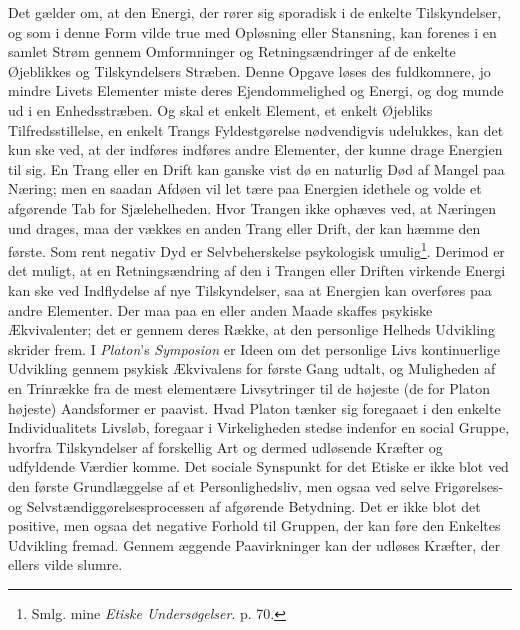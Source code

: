 \documentclass[12pt,a4paper]{book}
\newcommand{\opage}[1]{\marginnote{\footnotesize\textit{[#1]}}}
\begin{document}
Det gælder om, at den Energi, der rører sig sporadisk i de enkelte Tilskyndelser, og som i
denne Form vilde true med Opløsning eller Stansning, kan forenes i en samlet Strøm gennem
Omformninger og Retningsændringer af de enkelte Øjeblikkes og Tilskyndelsers Stræben. Denne
Opgave løses des fuldkomnere, jo mindre Livets Elementer miste deres Ejendommelighed og
Energi, og dog munde ud i en Enhedsstræben. Og skal et enkelt Element, et enkelt Øjebliks Tilfredsstillelse, en enkelt Trangs Fyldestgørelse nødvendigvis udelukkes, kan det kun ske
ved, at der indføres indføres andre Elementer, der kunne drage Energien til sig. En Trang eller en
Drift kan ganske vist dø en naturlig Død af Mangel paa Næring; men en saadan Afdøen vil let
tære paa Energien idethele og volde et afgørende Tab for Sjælehelheden. Hvor Trangen ikke
ophæves ved, at Næringen und%
\opage{352}drages, maa der vækkes en anden Trang eller Drift, der kan
hæmme den første. Som rent negativ Dyd er Selvbeherskelse psykologisk umulig\footnote{Smlg.
mine \emph{Etiske Undersøgelser}. p. 70.}. Derimod er det muligt, at en Retningsændring af
den i Trangen eller Driften virkende Energi kan ske ved Indflydelse af nye Tilskyndelser,
saa at Energien kan overføres paa andre Elementer. Der maa paa en eller anden Maade skaffes
psykiske Ækvivalenter; det er gennem deres Række, at den personlige Helheds Udvikling
skrider frem. I \emph{Platon}'s \emph{Symposion} er Ideen om det personlige Livs
kontinuerlige Udvikling gennem psykisk Ækvivalens for første Gang udtalt, og Muligheden af
en Trinrække fra de mest elementære Livsytringer til de højeste (de for Platon højeste)
Aandsformer er paavist. Hvad Platon tænker sig foregaaet i den enkelte Individualitets
Livsløb, foregaar i Virkeligheden stedse indenfor en social Gruppe, hvorfra Tilskyndelser
af forskellig Art og dermed udløsende Kræfter og udfyldende Værdier komme. Det sociale
Synspunkt for det Etiske er ikke blot ved den første Grundlæggelse af et Personlighedsliv,
men ogsaa ved selve Frigørelses- og Selvstændiggørelsesprocessen af afgørende Betydning.
Det er ikke blot det positive, men ogsaa det negative Forhold til Gruppen, der kan føre den
Enkeltes Udvikling fremad. Gennem æggende Paavirkninger kan der udløses Kræfter, der ellers
vilde slumre.
\end{document}
